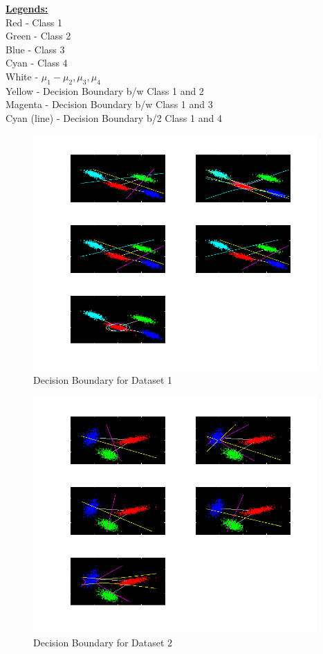 \documentclass[11pt,a4paper]{article}
\begin{document}
\underline{\textbf{Legends:}}\\
Red - Class 1\\
Green - Class 2\\
Blue - Class 3\\
Cyan - Class 4\\
White - $\mu_1 - \mu_2, \mu_3, \mu_4$\\
Yellow - Decision Boundary b/w Class 1 and 2 \\
Magenta - Decision Boundary b/w Class 1 and 3 \\
Cyan (line) - Decision Boundary b/2 Class 1 and 4 

\begin{figure}[H]
	\includegraphics[height=9cm]{Figures/LS_DB.png}
	\caption{Decision Boundary for Dataset 1}
\end{figure}

\begin{figure}[H]
	\includegraphics[height=9cm]{Figures/NLS_DB.png}
	\caption{Decision Boundary for Dataset 2}
\end{figure}
\end{document}
